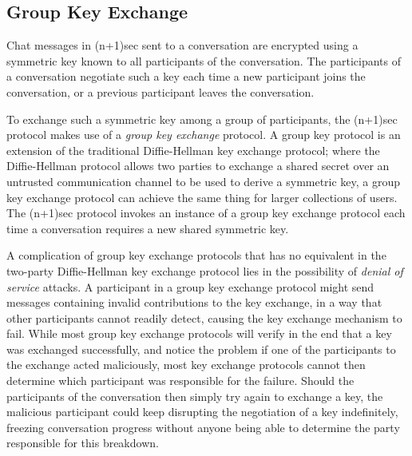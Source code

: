 \documentclass{article}
\begin{document}




\subsection{Group Key Exchange}
\label{sec:cryptography/group-key-exchange}

Chat messages in (n+1)sec sent to a conversation are encrypted using a symmetric key known to all participants of the conversation.
The participants of a conversation negotiate such a key each time a new participant joins the conversation, or a previous participant leaves the conversation.

To exchange such a symmetric key among a group of participants, the (n+1)sec protocol makes use of a \emph{group key exchange} protocol.
A group key protocol is an extension of the traditional Diffie-Hellman key exchange protocol; where the Diffie-Hellman protocol allows two parties to exchange a shared secret over an untrusted communication channel to be used to derive a symmetric key, a group key exchange protocol can achieve the same thing for larger collections of users.
The (n+1)sec protocol invokes an instance of a group key exchange protocol each time a conversation requires a new shared symmetric key.

A complication of group key exchange protocols that has no equivalent in the two-party Diffie-Hellman key exchange protocol lies in the possibility of \emph{denial of service} attacks.
A participant in a group key exchange protocol might send messages containing invalid contributions to the key exchange, in a way that other participants cannot readily detect, causing the key exchange mechanism to fail.
While most group key exchange protocols will verify in the end that a key was exchanged successfully, and notice the problem if one of the participants to the exchange acted maliciously, most key exchange protocols cannot then determine which participant was responsible for the failure.
Should the participants of the conversation then simply try again to exchange a key, the malicious participant could keep disrupting the negotiation of a key indefinitely, freezing conversation progress without anyone being able to determine the party responsible for this breakdown.
\end{document}

